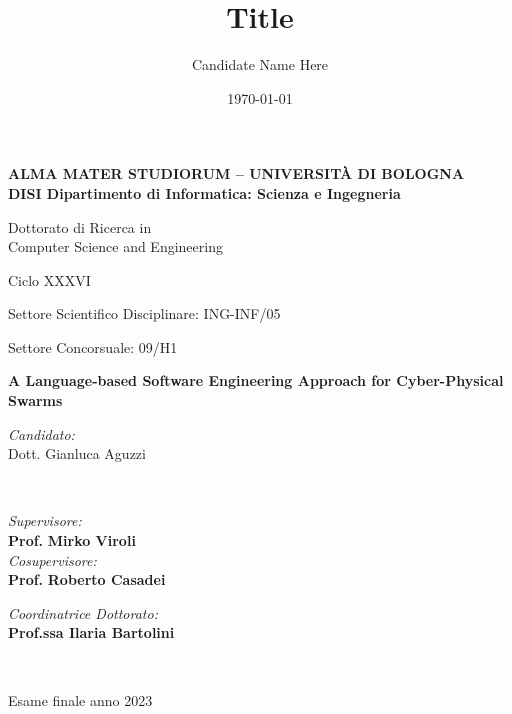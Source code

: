 \title{Title}
\author{Candidate Name Here}
\date{\today}

\begin{titlepage}
	\begin{center}
		
		\large
		\textbf{ALMA MATER STUDIORUM -- UNIVERSITÀ DI BOLOGNA \\ DISI Dipartimento di Informatica: Scienza e Ingegneria}
		\\
		\noindent\hrulefill
		\vspace{0.4cm}
		
		\Large
		Dottorato di Ricerca in \\
		Computer Science and Engineering

		\vspace{0.4cm}

		Ciclo XXXVI

		\vspace{0.4cm}

		Settore Scientifico Disciplinare: ING-INF/05
		
		Settore Concorsuale: 09/H1
		
		\Huge
		\vspace{3cm}
		\textbf{
			A Language-based Software Engineering Approach for Cyber-Physical Swarms
		}
		
		{\Large{
		\vspace{3cm}
		
		\textit{Candidato:\\}
		\centering
		Dott. Gianluca Aguzzi}
		\\}
		\large
		\vspace{2.5cm}
		\begin{minipage}[t]{0.64\textwidth}
			\begin{flushleft}
				\textit{Supervisore:} 
				\\ 
				\textbf{Prof.} \textbf{Mirko Viroli}
				\\
				\vspace{0.4cm}
				\textit{Cosupervisore:} 
				\\
				\textbf{Prof.} \textbf{Roberto Casadei}
			\end{flushleft}
		\end{minipage}
		\begin{minipage}[t]{0.34\textwidth}
			\begin{flushright}
				\textit{Coordinatrice Dottorato:} 
				\\ 
				\textbf{Prof.ssa Ilaria Bartolini}
			\end{flushright}
		\end{minipage}\\
		
		\vfill
		\noindent\hrulefill
		\vspace{0.3cm}
		\Large

		Esame finale anno 2023
	\end{center}
\end{titlepage}
\restoregeometry

